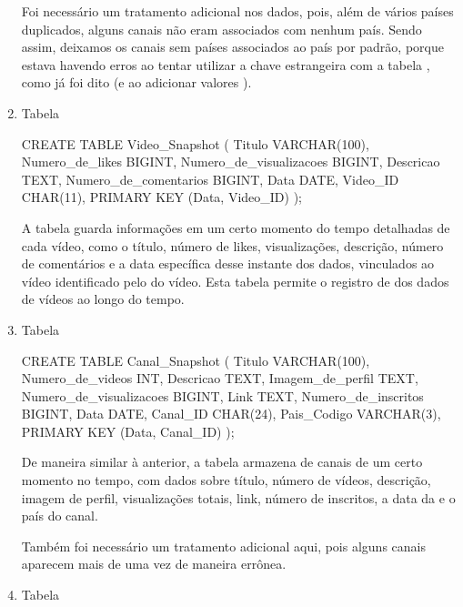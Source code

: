 \begin{enumerate}
  Foi necessário um tratamento adicional nos dados, pois, além de vários países duplicados, alguns canais não eram associados com nenhum país. Sendo assim, deixamos os canais sem países associados ao país  por padrão, porque estava havendo erros ao tentar utilizar a chave estrangeira com a tabela , como já foi dito (e ao adicionar valores ).

  \item Tabela 

  \begin{code}
    CREATE TABLE Video_Snapshot (
      Titulo VARCHAR(100),
      Numero_de_likes BIGINT,
      Numero_de_visualizacoes BIGINT,
      Descricao TEXT,
      Numero_de_comentarios BIGINT,
      Data DATE,
      Video_ID CHAR(11),
      PRIMARY KEY (Data, Video_ID)
    );
  \end{code}

  A tabela  guarda informações em um certo momento do tempo detalhadas de cada vídeo, como o título, número de likes, visualizações, descrição, número de comentários e a data específica desse instante dos dados, vinculados ao vídeo identificado pelo  do vídeo. Esta tabela permite o registro de  dos dados de vídeos ao longo do tempo.

  \item Tabela 

  \begin{code}
    CREATE TABLE Canal_Snapshot (
      Titulo VARCHAR(100),
      Numero_de_videos INT,
      Descricao TEXT,
      Imagem_de_perfil TEXT,
      Numero_de_visualizacoes BIGINT,
      Link TEXT,
      Numero_de_inscritos BIGINT,
      Data DATE,
      Canal_ID CHAR(24),
      Pais_Codigo VARCHAR(3),
      PRIMARY KEY (Data, Canal_ID)
    );
  \end{code}

  De maneira similar à anterior, a tabela  armazena  de canais de um certo momento no tempo, com dados sobre título, número de vídeos, descrição, imagem de perfil, visualizações totais, link, número de inscritos, a data da  e o país do canal.

  Também foi necessário um tratamento adicional aqui, pois alguns canais aparecem mais de uma vez de maneira errônea.

  \item Tabela 


\end{enumerate}
